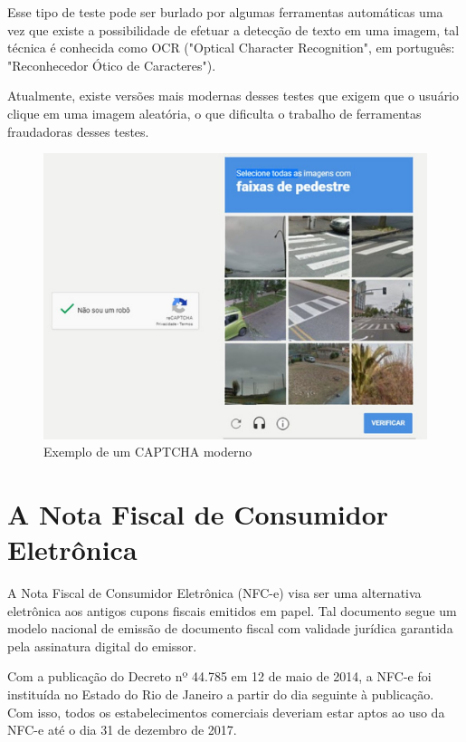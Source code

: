 Esse tipo de teste pode ser burlado por algumas ferramentas automáticas uma vez que existe a possibilidade de efetuar a detecção de texto em uma imagem, tal técnica é conhecida como OCR ("Optical Character Recognition", em português: "Reconhecedor Ótico de Caracteres").\cite{captchaExame}

Atualmente, existe versões mais modernas desses testes que exigem que o usuário clique em uma imagem aleatória, o que dificulta o trabalho de ferramentas fraudadoras desses testes.\cite{captchaExame}

\begin{figure}[h]
    \centering
    \includegraphics[scale=0.15]{tcc/figures/captcha/recaptcha-post-g1.jpg}
    \caption{Exemplo de um CAPTCHA moderno}
    \label{fig-exemplo-captcha-alfanumerico}
\end{figure}

\section{A Nota Fiscal de Consumidor Eletrônica}\label{secNfce}

A Nota Fiscal de Consumidor Eletrônica (NFC-e) visa ser uma alternativa eletrônica aos antigos cupons fiscais emitidos em papel. Tal documento segue um modelo nacional de emissão de documento fiscal com validade jurídica garantida pela assinatura digital do emissor.

Com a publicação do Decreto nº 44.785 em 12 de maio de 2014, a NFC-e foi instituída no Estado do Rio de Janeiro a partir do dia seguinte à publicação. Com isso, todos os estabelecimentos comerciais deveriam estar aptos ao uso da NFC-e até o dia 31 de dezembro de 2017.\cite{nfceDefinicao}


